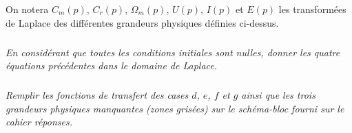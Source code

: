 \documentclass[10pt]{article}
\begin{document}
{On notera $C_m(p)$, $C_r(p)$, $\Omega_m(p)$, $U(p)$, $I(p)$ et $E(p)$ les transformées de Laplace des différentes grandeurs physiques définies ci-dessus.}

\subparagraph{}
\textit{En considérant que toutes les conditions initiales sont nulles, donner les quatre équations précédentes dans le domaine de Laplace.}

\subparagraph{}
\textit{Remplir les fonctions de transfert des cases $d$, $e$, $f$ et $g$ ainsi que les trois grandeurs physiques manquantes (zones grisées) sur le schéma-bloc fourni sur le cahier réponses.}
\end{document}
